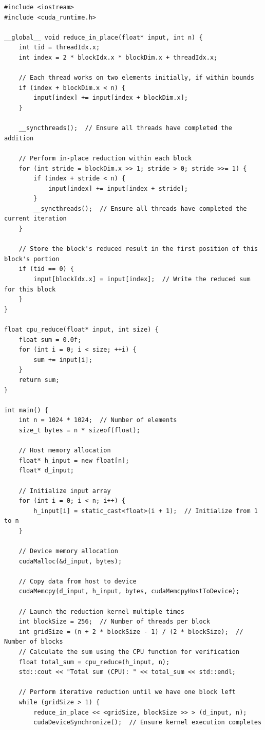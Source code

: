 \begin{lstlisting}[caption={优化后的向量归约内核（增加每线程工作量）}]
#include <iostream>
#include <cuda_runtime.h>

__global__ void reduce_in_place(float* input, int n) {
    int tid = threadIdx.x;
    int index = 2 * blockIdx.x * blockDim.x + threadIdx.x;

    // Each thread works on two elements initially, if within bounds
    if (index + blockDim.x < n) {
        input[index] += input[index + blockDim.x];
    }

    __syncthreads();  // Ensure all threads have completed the addition

    // Perform in-place reduction within each block
    for (int stride = blockDim.x >> 1; stride > 0; stride >>= 1) {
        if (index + stride < n) {
            input[index] += input[index + stride];
        }
        __syncthreads();  // Ensure all threads have completed the current iteration
    }

    // Store the block's reduced result in the first position of this block's portion
    if (tid == 0) {
        input[blockIdx.x] = input[index];  // Write the reduced sum for this block
    }
}

float cpu_reduce(float* input, int size) {
    float sum = 0.0f;
    for (int i = 0; i < size; ++i) {
        sum += input[i];
    }
    return sum;
}

int main() {
    int n = 1024 * 1024;  // Number of elements
    size_t bytes = n * sizeof(float);

    // Host memory allocation
    float* h_input = new float[n];
    float* d_input;

    // Initialize input array
    for (int i = 0; i < n; i++) {
        h_input[i] = static_cast<float>(i + 1);  // Initialize from 1 to n
    }

    // Device memory allocation
    cudaMalloc(&d_input, bytes);

    // Copy data from host to device
    cudaMemcpy(d_input, h_input, bytes, cudaMemcpyHostToDevice);

    // Launch the reduction kernel multiple times
    int blockSize = 256;  // Number of threads per block
    int gridSize = (n + 2 * blockSize - 1) / (2 * blockSize);  // Number of blocks
    // Calculate the sum using the CPU function for verification
    float total_sum = cpu_reduce(h_input, n);
    std::cout << "Total sum (CPU): " << total_sum << std::endl;

    // Perform iterative reduction until we have one block left
    while (gridSize > 1) {
        reduce_in_place << <gridSize, blockSize >> > (d_input, n);
        cudaDeviceSynchronize();  // Ensure kernel execution completes


\end{lstlisting}
